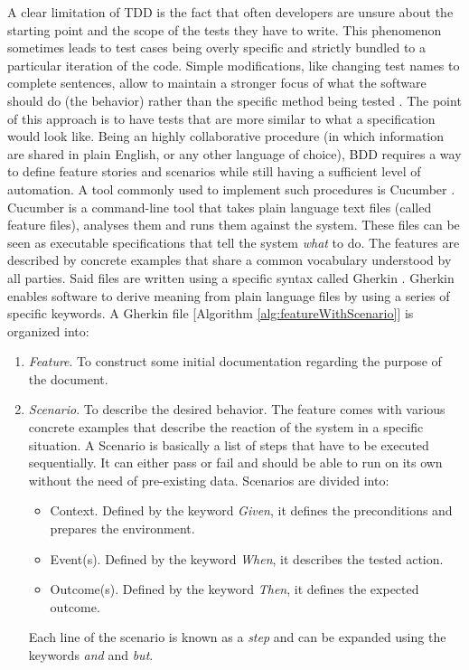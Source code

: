 A clear limitation of TDD is the fact that often developers are unsure about the starting point and the scope of the tests they have to write. This phenomenon sometimes leads to test cases being overly specific and strictly bundled to a particular iteration of the code. Simple modifications, like changing test names to complete sentences, allow to maintain a stronger focus of what the software should do (the behavior) rather than the specific method being tested \cite[pg.~14]{BDD}. The point of this approach is to have tests that are more similar to what a specification would look like. Being an highly collaborative procedure (in which information are shared in plain English, or any other language of choice), BDD requires a way to define feature stories and scenarios while still having a sufficient level of automation. A tool commonly used to implement such procedures is Cucumber \cite{Cucumber}. Cucumber is a command-line tool that takes plain language text files (called feature files), analyses them and runs them against the system. These files can be seen as executable specifications that tell the system \textit{what} to do. The features are described by concrete examples that share a common vocabulary understood by all parties. Said files are written using a specific syntax called Gherkin \cite[p.~25]{Cucumber}. Gherkin enables software to derive meaning from plain language files by using a series of specific keywords. A Gherkin file [Algorithm \ref{alg:featureWithScenario}] is organized into:

\begin{enumerate}
  \item \textit{Feature}. To construct some initial documentation regarding the purpose of the document.
  \item \textit{Scenario}. To describe the desired behavior. The feature comes with various concrete examples that describe the reaction of the system in a specific situation. A Scenario is basically a list of steps that have to be executed sequentially. It can either pass or fail and should be able to run on its own without the need of pre-existing data. Scenarios are divided into:
  \begin{itemize}
    \item Context. Defined by the keyword \textit{Given}, it defines the preconditions and prepares the environment.
    \item Event(s). Defined by the keyword \textit{When}, it describes the tested action.
    \item Outcome(s). Defined by the keyword \textit{Then}, it defines the expected outcome.
  \end{itemize}
  
  Each line of the scenario is known as a \textit{step} and can be expanded using the keywords \textit{and} and \textit{but}.
\end{enumerate}

